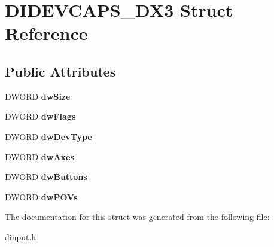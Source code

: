 \hypertarget{struct_d_i_d_e_v_c_a_p_s___d_x3}{\section{D\-I\-D\-E\-V\-C\-A\-P\-S\-\_\-\-D\-X3 Struct Reference}
\label{struct_d_i_d_e_v_c_a_p_s___d_x3}
}
\subsection*{Public Attributes}
\begin{DoxyCompactItemize}
\item 
\hypertarget{struct_d_i_d_e_v_c_a_p_s___d_x3_a8326c31bd94bd6e7e4329254a2cf1039}{D\-W\-O\-R\-D {\bfseries dw\-Size}}\label{struct_d_i_d_e_v_c_a_p_s___d_x3_a8326c31bd94bd6e7e4329254a2cf1039}

\item 
\hypertarget{struct_d_i_d_e_v_c_a_p_s___d_x3_ac1b37945e13e2800d640dd6c2aef4e47}{D\-W\-O\-R\-D {\bfseries dw\-Flags}}\label{struct_d_i_d_e_v_c_a_p_s___d_x3_ac1b37945e13e2800d640dd6c2aef4e47}

\item 
\hypertarget{struct_d_i_d_e_v_c_a_p_s___d_x3_a3ba660487a247fb2d718ae99b5fa316b}{D\-W\-O\-R\-D {\bfseries dw\-Dev\-Type}}\label{struct_d_i_d_e_v_c_a_p_s___d_x3_a3ba660487a247fb2d718ae99b5fa316b}

\item 
\hypertarget{struct_d_i_d_e_v_c_a_p_s___d_x3_a4b2cf49780fb8f068dff2e665c750dee}{D\-W\-O\-R\-D {\bfseries dw\-Axes}}\label{struct_d_i_d_e_v_c_a_p_s___d_x3_a4b2cf49780fb8f068dff2e665c750dee}

\item 
\hypertarget{struct_d_i_d_e_v_c_a_p_s___d_x3_a15bf4de36cf993a8fa12e67143e4f73e}{D\-W\-O\-R\-D {\bfseries dw\-Buttons}}\label{struct_d_i_d_e_v_c_a_p_s___d_x3_a15bf4de36cf993a8fa12e67143e4f73e}

\item 
\hypertarget{struct_d_i_d_e_v_c_a_p_s___d_x3_ad65b3e8282d28c2c24517876fbb44aac}{D\-W\-O\-R\-D {\bfseries dw\-P\-O\-Vs}}\label{struct_d_i_d_e_v_c_a_p_s___d_x3_ad65b3e8282d28c2c24517876fbb44aac}

\end{DoxyCompactItemize}


The documentation for this struct was generated from the following file\-:\begin{DoxyCompactItemize}
\item 
dinput.\-h\end{DoxyCompactItemize}
